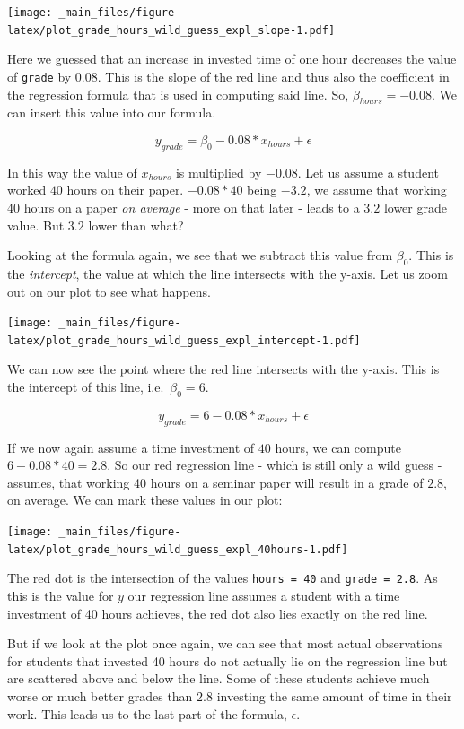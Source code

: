 \documentclass[
]{book}
\begin{document}
\texttt{[image: \_main\_files/figure-latex/plot\_grade\_hours\_wild\_guess\_expl\_slope-1.pdf]}

Here we guessed that an increase in invested time of one hour decreases the
value of \texttt{grade} by \(0.08\). This is the slope of the red line and thus also the
coefficient in the regression formula that is used in computing said line. So,
\(\beta_{hours} = -0.08\). We can insert this value into our formula.

\[y_{grade} = \beta_0 -0.08*x_{hours} + \epsilon\]

In this way the value of \(x_{hours}\) is multiplied by \(-0.08\). Let us assume a
student worked \(40\) hours on their paper. \(-0.08*40\) being \(-3.2\), we assume that
working 40 hours on a paper \emph{on average} - more on that later - leads to a \(3.2\)
lower grade value. But \(3.2\) lower than what?

Looking at the formula again, we see that we subtract this value from \(\beta_0\).
This is the \emph{intercept}, the value at which the line intersects with the y-axis.
Let us zoom out on our plot to see what happens.

\texttt{[image: \_main\_files/figure-latex/plot\_grade\_hours\_wild\_guess\_expl\_intercept-1.pdf]}

We can now see the point where the red line intersects with the y-axis. This is
the intercept of this line, i.e.~\(\beta_0 = 6\).

\[y_{grade} = 6 -0.08*x_{hours} + \epsilon\]

If we now again assume a time investment of \(40\) hours, we can compute
\(6-0.08*40 = 2.8\). So our red regression line - which is still only a wild guess
- assumes, that working 40 hours on a seminar paper will result in a grade of
\(2.8\), on average. We can mark these values in our plot:

\texttt{[image: \_main\_files/figure-latex/plot\_grade\_hours\_wild\_guess\_expl\_40hours-1.pdf]}

The red dot is the intersection of the values \texttt{hours\ =\ 40} and \texttt{grade\ =\ 2.8}.
As this is the value for \(y\) our regression line assumes a student with a time
investment of 40 hours achieves, the red dot also lies exactly on the red line.

But if we look at the plot once again, we can see that most actual observations
for students that invested 40 hours do not actually lie on the regression line
but are scattered above and below the line. Some of these students achieve
much worse or much better grades than \(2.8\) investing the same amount of time in
their work. This leads us to the last part of the formula, \(\epsilon\).
\end{document}

